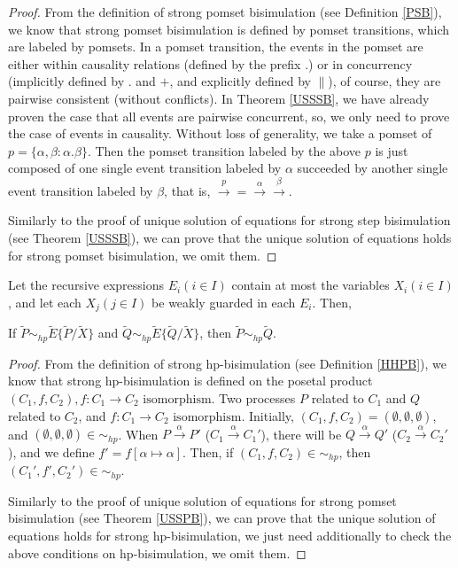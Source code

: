 \begin{proof}
From the definition of strong pomset bisimulation (see Definition \ref{PSB}), we know that strong pomset bisimulation is defined by pomset transitions, which are labeled by pomsets. In a pomset transition, the events in the pomset are either within causality relations (defined by the prefix $.$) or in concurrency (implicitly defined by $.$ and $+$, and explicitly defined by $\parallel$), of course, they are pairwise consistent (without conflicts). In Theorem \ref{USSSB}, we have already proven the case that all events are pairwise concurrent, so, we only need to prove the case of events in causality. Without loss of generality, we take a pomset of $p=\{\alpha,\beta:\alpha.\beta\}$. Then the pomset transition labeled by the above $p$ is just composed of one single event transition labeled by $\alpha$ succeeded by another single event transition labeled by $\beta$, that is, $\xrightarrow{p}=\xrightarrow{\alpha}\xrightarrow{\beta}$.

Similarly to the proof of unique solution of equations for strong step bisimulation (see Theorem \ref{USSSB}), we can prove that the unique solution of equations holds for strong pomset bisimulation, we omit them.
\end{proof}

\begin{theorem}\label{USSHPB}
Let the recursive expressions $E_i(i\in I)$ contain at most the variables $X_i(i\in I)$, and let each $X_j(j\in I)$ be weakly guarded in each $E_i$. Then,

If $\widetilde{P}\sim_{hp} \widetilde{E}\{\widetilde{P}/\widetilde{X}\}$ and $\widetilde{Q}\sim_{hp} \widetilde{E}\{\widetilde{Q}/\widetilde{X}\}$, then $\widetilde{P}\sim_{hp} \widetilde{Q}$.
\end{theorem}

\begin{proof}
From the definition of strong hp-bisimulation (see Definition \ref{HHPB}), we know that strong hp-bisimulation is defined on the posetal product $(C_1,f,C_2),f:C_1\rightarrow C_2\textrm{ isomorphism}$. Two processes $P$ related to $C_1$ and $Q$ related to $C_2$, and $f:C_1\rightarrow C_2\textrm{ isomorphism}$. Initially, $(C_1,f,C_2)=(\emptyset,\emptyset,\emptyset)$, and $(\emptyset,\emptyset,\emptyset)\in\sim_{hp}$. When $P\xrightarrow{\alpha}P'$ ($C_1\xrightarrow{\alpha}C_1'$), there will be $Q\xrightarrow{\alpha}Q'$ ($C_2\xrightarrow{\alpha}C_2'$), and we define $f'=f[\alpha\mapsto \alpha]$. Then, if $(C_1,f,C_2)\in\sim_{hp}$, then $(C_1',f',C_2')\in\sim_{hp}$.

Similarly to the proof of unique solution of equations for strong pomset bisimulation (see Theorem \ref{USSPB}), we can prove that the unique solution of equations holds for strong hp-bisimulation, we just need additionally to check the above conditions on hp-bisimulation, we omit them.
\end{proof}

